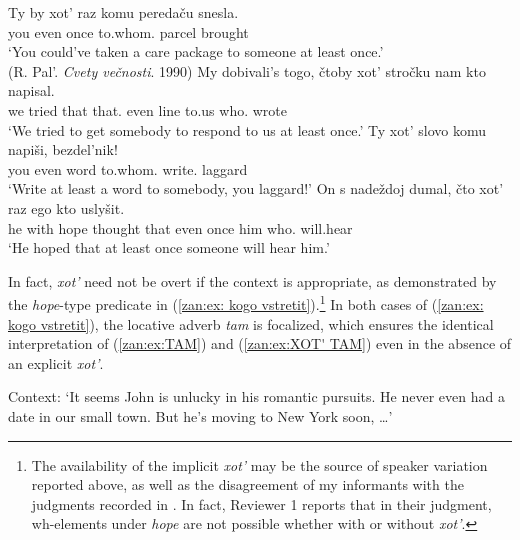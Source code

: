 \documentclass[output=paper,colorlinks,citecolor=brown]{langscibook}
\begin{document}
\ea \label{zan:ex:XOT'-environments}
\ea\label{zan:ex:XOT'-environmentsa}
\gll Ty by xot' raz komu peredaču snesla.\\
       you {\SBJV} even once to.whom.{\INDF} parcel brought\\
         \glt `You could've taken a care package to someone at least once.'\\ \hfill {(R. Pal'. \textit{Cvety ve\v{c}nosti}. 1990)}
\ex\label{zan:ex:XOT'-environmentsb} 
\gll My	dobivali's togo, 	čtoby xot' stročku	nam  kto napisal.\\
we tried that	 that.{\SBJV}	even line to.us who.{\INDF} wrote\\
    \glt `We tried to get somebody to respond to us at least once.'
\ex\label{zan:ex:XOT'-environmentsc}  
\gll  Ty xot' slovo komu napiši, bezdel'nik! \\
you even word to.whom.{\INDF} write.{\IMP} laggard \\
        \glt `Write at least a word to somebody, you laggard!'
\ex\label{zan:ex:XOT'-environmentsd} 
\gll On s nadeždoj dumal, čto xot' raz ego kto uslyšit.\\
he with hope thought that even once him who.{\INDF} will.hear\\
\glt `He hoped that at least once someone will hear him.'
\z
\z

\noindent In fact, \textit{xot'} need not be overt if the context is appropriate, as demonstrated by the \textit{hope}-type predicate in (\ref{zan:ex: kogo vstretit}).\footnote{The availability of the implicit \textit{xot'} may be the source of speaker variation reported above, as well as the disagreement of my informants with the judgments recorded in \citet{heng2018}. In fact, Reviewer 1 reports that in their judgment, wh-elements under \textit{hope} are not possible whether with or without \textit{xot'}.} In both cases of (\ref{zan:ex: kogo vstretit}), the locative adverb \textit{tam} is focalized, which ensures the identical interpretation of (\ref{zan:ex:TAM}) and (\ref{zan:ex:XOT' TAM}) even in the absence of an explicit \textit{xot'}.


\ea \label{zan:ex: kogo vstretit} Context: `It seems John is unlucky in his romantic pursuits. He never even had a date in our small town. But he's moving to New York soon, \dots' 
\begin{xlist}
\end{xlist}
\z
\end{document}
